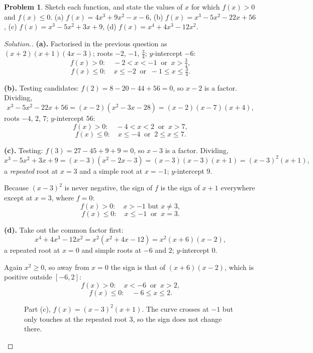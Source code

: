 \documentclass[11pt,a4paper]{article}
\theoremstyle{definition}
\newtheorem{problemx}{Problem}[section]
\newenvironment{problem}{\begin{problemx}}{\end{problemx}}
\newenvironment{solution}
  {\renewcommand{\qedsymbol}{}\begin{proof}[\textit{Solution}.]}
  {\end{proof}}
\begin{document}
\begin{problem}
Sketch each function, and state the values of $x$ for which $f(x)>0$ and $f(x)\leq 0$.
\quad (a) $f(x)=4x^3+9x^2-x-6$, \quad (b) $f(x)=x^3-5x^2-22x+56$, \quad
(c) $f(x)=x^3-5x^2+3x+9$, \quad (d) $f(x)=x^4+4x^3-12x^2$.
\end{problem}

\begin{solution}
\textbf{(a).} Factorised in the previous question as $(x+2)(x+1)(4x-3)$; roots $-2$,
$-1$, $\frac{3}{4}$; $y$-intercept $-6$:
$$f(x)>0:\quad -2<x<-1\ \text{ or }\ x>\tfrac{3}{4},$$
$$f(x)\leq 0:\quad x\leq -2\ \text{ or }\ -1\leq x\leq\tfrac{3}{4}.$$

\textbf{(b).} Testing candidates: $f(2)=8-20-44+56=0$, so $x-2$ is a factor. Dividing,
$$x^3-5x^2-22x+56=(x-2)\left(x^2-3x-28\right)=(x-2)(x-7)(x+4),$$
roots $-4$, $2$, $7$; $y$-intercept $56$:
$$f(x)>0:\quad -4<x<2\ \text{ or }\ x>7,$$
$$f(x)\leq 0:\quad x\leq -4\ \text{ or }\ 2\leq x\leq 7.$$

\textbf{(c).} Testing: $f(3)=27-45+9+9=0$, so $x-3$ is a factor. Dividing,
$$x^3-5x^2+3x+9=(x-3)\left(x^2-2x-3\right)=(x-3)(x-3)(x+1)=(x-3)^2(x+1),$$
a \emph{repeated} root at $x=3$ and a simple root at $x=-1$; $y$-intercept $9$.

Because $(x-3)^2$ is never negative, the sign of $f$ is the sign of $x+1$ everywhere
except at $x=3$, where $f=0$:
$$f(x)>0:\quad x>-1 \text{ but } x\neq 3,$$
$$f(x)\leq 0:\quad x\leq -1\ \text{ or }\ x=3.$$

\textbf{(d).} Take out the common factor first:
$$x^4+4x^3-12x^2=x^2\left(x^2+4x-12\right)=x^2(x+6)(x-2),$$
a repeated root at $x=0$ and simple roots at $-6$ and $2$; $y$-intercept $0$.

Again $x^2\geq 0$, so away from $x=0$ the sign is that of $(x+6)(x-2)$, which is
positive outside $[-6,2]$:
$$f(x)>0:\quad x<-6\ \text{ or }\ x>2,$$
$$f(x)\leq 0:\quad -6\leq x\leq 2.$$

\begin{figure}[H]
\centering
{}
\caption{Part (c), $f(x)=(x-3)^2(x+1)$. The curve crosses at $-1$ but only touches at the repeated root $3$, so the sign does not change there.}
\end{figure}


\end{solution}
\end{document}
